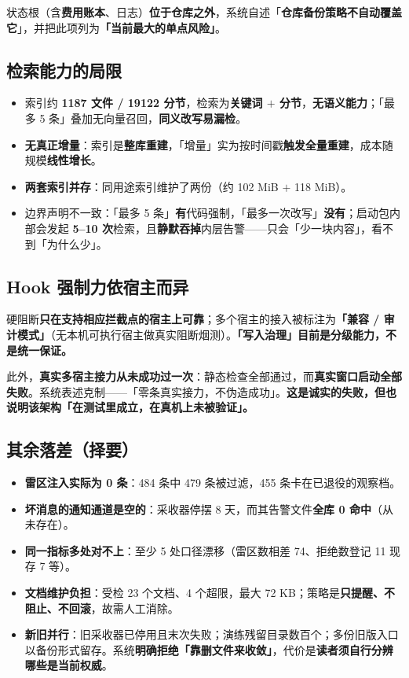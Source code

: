 \documentclass[11pt,a4paper]{ctexart}
\begin{document}
状态根（含\textbf{费用账本}、日志）\textbf{位于仓库之外}，系统自述「\textbf{仓库备份策略不自动覆盖它}」，并把此项列为\textbf{「当前最大的单点风险」}。

\subsection{检索能力的局限}

\begin{itemize}
  \item 索引约 \textbf{1187 文件 / 19122 分节}，检索为\textbf{关键词 $+$ 分节}，\textbf{无语义能力}；「最多 5 条」叠加无向量召回，\textbf{同义改写易漏检}。
  \item \textbf{无真正增量}：索引是\textbf{整库重建}，「增量」实为按时间戳\textbf{触发全量重建}，成本随规模\textbf{线性增长}。
  \item \textbf{两套索引并存}：同用途索引维护了两份（约 102 MiB $+$ 118 MiB）。
  \item 边界声明不一致：「最多 5 条」\textbf{有}代码强制，「最多一次改写」\textbf{没有}；启动包内部会发起 \textbf{5--10 次}检索，且\textbf{静默吞掉}内层告警——只会「少一块内容」，看不到「为什么少」。
\end{itemize}

\subsection{Hook 强制力依宿主而异}

硬阻断\textbf{只在支持相应拦截点的宿主上可靠}；多个宿主的接入被标注为\textbf{「兼容 / 审计模式」}（无本机可执行宿主做真实阻断烟测）。\textbf{「写入治理」目前是分级能力，不是统一保证。}

此外，\textbf{真实多宿主接力从未成功过一次}：静态检查全部通过，而\textbf{真实窗口启动全部失败}。系统表述克制——「零条真实接力，不伪造成功」。\textbf{这是诚实的失败，但也说明该架构「在测试里成立，在真机上未被验证」。}

\subsection{其余落差（择要）}

\begin{itemize}
  \item \textbf{雷区注入实际为 0 条}：484 条中 479 条被过滤，455 条卡在已退役的观察档。
  \item \textbf{坏消息的通知通道是空的}：采收器停摆 8 天，而其告警文件\textbf{全库 0 命中}（从未存在）。
  \item \textbf{同一指标多处对不上}：至少 5 处口径漂移（雷区数相差 74、拒绝数登记 11 现存 7 等）。
  \item \textbf{文档维护负担}：受检 23 个文档、4 个超限，最大 72 KB；策略是\textbf{只提醒、不阻止、不回滚}，故需人工消除。
  \item \textbf{新旧并行}：旧采收器已停用且末次失败；演练残留目录数百个；多份旧版入口以备份形式留存。系统\textbf{明确拒绝「靠删文件来收敛」}，代价是\textbf{读者须自行分辨哪些是当前权威}。
\end{itemize}
\end{document}
